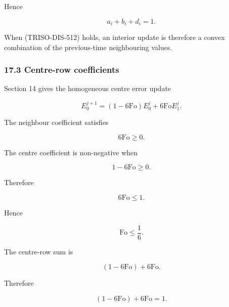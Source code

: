 \documentclass[11pt,a4paper]{article}
\begin{document}
Hence

\begin{equation}
\boxed{
a_i+b_i+d_i=1.
}
\tag{TRISO-DIS-517}
\label{eq:triso-dis-517}
\end{equation}

When (TRISO-DIS-512) holds, an interior update is therefore a convex combination of the previous-time neighbouring values.

\subsubsection*{17.3 Centre-row coefficients}

Section 14 gives the homogeneous centre error update

\begin{equation}
E_0^{j+1}
=
(1-6\mathrm{Fo})E_0^j
+
6\mathrm{Fo}E_1^j.
\tag{TRISO-DIS-518}
\label{eq:triso-dis-518}
\end{equation}

The neighbour coefficient satisfies

\begin{equation}
6\mathrm{Fo}\ge0.
\tag{TRISO-DIS-519}
\label{eq:triso-dis-519}
\end{equation}

The centre coefficient is non-negative when

\begin{equation}
1-6\mathrm{Fo}\ge0.
\tag{TRISO-DIS-520}
\label{eq:triso-dis-520}
\end{equation}

Therefore

\begin{equation}
6\mathrm{Fo}\le1.
\tag{TRISO-DIS-521}
\label{eq:triso-dis-521}
\end{equation}

Hence

\begin{equation}
\boxed{
\mathrm{Fo}\le\frac16.
}
\tag{TRISO-DIS-522}
\label{eq:triso-dis-522}
\end{equation}

The centre-row sum is

\begin{equation}
(1-6\mathrm{Fo})+6\mathrm{Fo}.
\tag{TRISO-DIS-523}
\label{eq:triso-dis-523}
\end{equation}

Therefore

\begin{equation}
\boxed{
(1-6\mathrm{Fo})+6\mathrm{Fo}=1.
}
\tag{TRISO-DIS-524}
\label{eq:triso-dis-524}
\end{equation}
\end{document}
